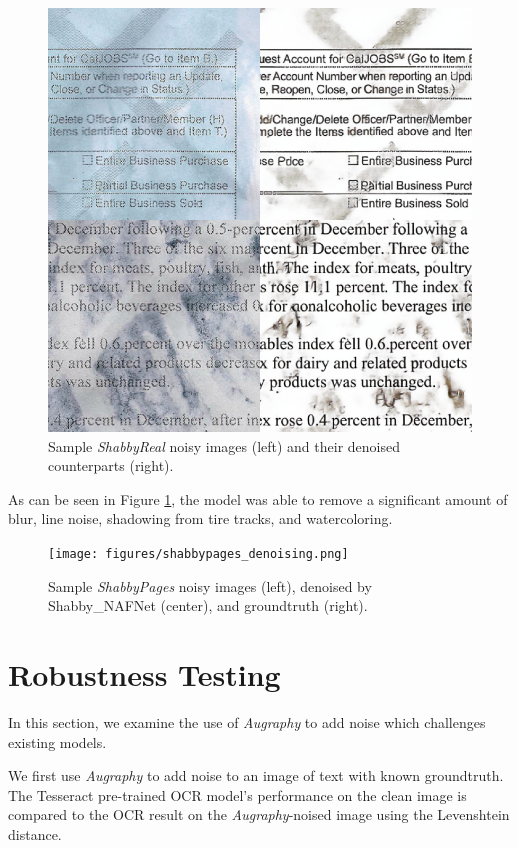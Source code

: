 \documentclass[runningheads]{llncs}
\begin{document}
\begin{figure}
\centering
\includegraphics[width=0.98\columnwidth]{figures/shabbyreal_denoised.png}
\caption{Sample \emph{ShabbyReal} noisy images (left) and their denoised counterparts (right).}
\label{fig:shabbyreal_denoised}
\end{figure}

As can be seen in Figure \ref{fig:shabbyreal_denoised}, the model was able to remove a significant amount of blur, line noise, shadowing from tire tracks, and watercoloring.

\begin{figure}
\centering
\texttt{[image: figures/shabbypages\_denoising.png]}
\caption{Sample \emph{ShabbyPages} noisy images (left), denoised by Shabby\_NAFNet (center), and groundtruth (right).}
\label{fig:shabbypages_denoising}
\end{figure}

\section{Robustness Testing}
In this section, we examine the use of \emph{Augraphy} to add noise which challenges existing models.

We first use \emph{Augraphy} to add noise to an image of text with known groundtruth.
The Tesseract \cite{ref_tesseract} pre-trained OCR model's performance on the clean image is compared to the OCR result on the \emph{Augraphy}-noised image using the Levenshtein distance.
\end{document}
